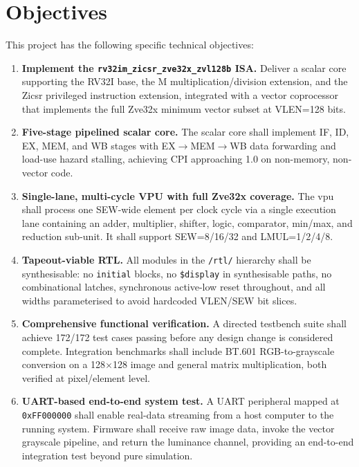 \section{Objectives}
\label{sec:objectives}

This project has the following specific technical objectives:

\begin{enumerate}[label=\arabic*.]
  \item \textbf{Implement the \texttt{rv32im\_zicsr\_zve32x\_zvl128b} ISA.}
        Deliver a scalar core supporting the RV32I base, the M multiplication/division
        extension, and the Zicsr privileged instruction extension, integrated with a
        vector coprocessor that implements the full Zve32x minimum vector subset at
        VLEN=128 bits.

  \item \textbf{Five-stage pipelined scalar core.}
        The scalar core shall implement IF, ID, EX, MEM, and WB stages with
        EX$\rightarrow$MEM$\rightarrow$WB data forwarding and load-use hazard stalling,
        achieving CPI approaching 1.0 on non-memory, non-vector code.

  \item \textbf{Single-lane, multi-cycle VPU with full Zve32x coverage.}
        The \gls{vpu} shall process one SEW-wide element per clock cycle via a single
        execution lane containing an adder, multiplier, shifter, logic, comparator,
        min/max, and reduction sub-unit. It shall support SEW=8/16/32 and
        LMUL=1/2/4/8.

  \item \textbf{Tapeout-viable RTL.}
        All modules in the \texttt{/rtl/} hierarchy shall be synthesisable: no
        \texttt{initial} blocks, no \texttt{\$display} in synthesisable paths, no
        combinational latches, synchronous active-low reset throughout, and all widths
        parameterised to avoid hardcoded VLEN/SEW bit slices.

  \item \textbf{Comprehensive functional verification.}
        A directed testbench suite shall achieve 172/172 test cases passing before any
        design change is considered complete. Integration benchmarks shall include
        BT.601 RGB-to-grayscale conversion on a 128$\times$128 image and general
        matrix multiplication, both verified at pixel/element level.

  \item \textbf{UART-based end-to-end system test.}
        A UART peripheral mapped at \texttt{0xFF000000} shall enable real-data
        streaming from a host computer to the running system. Firmware shall receive
        raw image data, invoke the vector grayscale pipeline, and return the luminance
        channel, providing an end-to-end integration test beyond pure simulation.
\end{enumerate}

